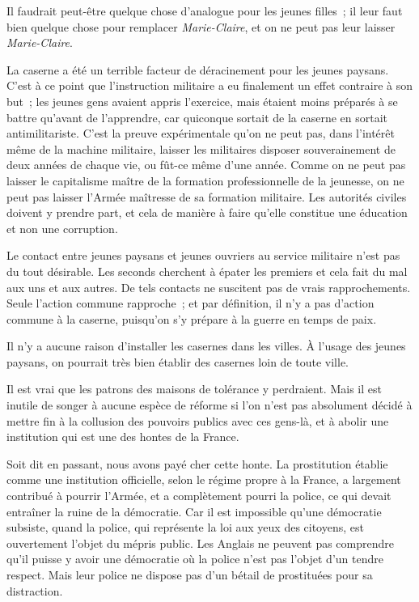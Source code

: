 \documentclass[french,twoside]{book} %
\begin{document}
Il faudrait peut-être quelque chose d'analogue pour les jeunes filles ; il leur faut bien quelque chose pour remplacer {\itshape Marie-Claire}, et on ne peut pas leur laisser {\itshape Marie-Claire}.\par
La caserne a été un terrible facteur de déracinement pour les jeunes paysans. C'est à ce point que l'instruction militaire a eu finalement un effet contraire à son but ; les jeunes gens avaient appris l'exercice, mais étaient moins préparés à se battre qu'avant de l'apprendre, car quiconque sortait de la caserne en sortait antimilitariste. C'est la preuve expérimentale qu'on ne peut pas, dans l'intérêt même de la machine militaire, laisser les militaires disposer souverainement de deux années de chaque vie, ou fût-ce même d'une année. Comme on ne peut pas laisser le capitalisme maître de la formation professionnelle de la jeunesse, on ne peut pas laisser l'Armée maîtresse de sa formation militaire. Les autorités civiles doivent y prendre part, et cela de manière à faire qu'elle constitue une éducation et non une corruption.\par
Le contact entre jeunes paysans et jeunes ouvriers au service militaire n'est pas du tout désirable. Les seconds cherchent à épater les premiers et cela fait du mal aux uns et aux autres. De tels contacts ne suscitent pas de vrais rapprochements. Seule l'action commune rapproche ; et par définition, il n'y a pas d'action commune à la caserne, puisqu'on s'y prépare à la guerre en temps de paix.\par
Il n'y a aucune raison d'installer les casernes dans les villes. À l'usage des jeunes paysans, on pourrait très bien établir des casernes loin de toute ville.\par
Il est vrai que les patrons des maisons de tolérance y perdraient. Mais il est inutile de songer à aucune espèce de réforme si l'on n'est pas absolument décidé à mettre fin à la collusion des pouvoirs publics avec ces gens-là, et à abolir une institution qui est une des hontes de la France.\par
Soit dit en passant, nous avons payé cher cette honte. La prostitution établie comme une institution officielle, selon le régime propre à la France, a largement contribué à pourrir l'Armée, et a complètement pourri la police, ce qui devait entraîner la ruine de la démocratie. Car il est impossible qu'une démocratie subsiste, quand la police, qui représente la loi aux yeux des citoyens, est ouvertement l'objet du mépris public. Les Anglais ne peuvent pas comprendre qu'il puisse y avoir une démocratie où la police n'est pas l'objet d'un tendre respect. Mais leur police ne dispose pas d'un bétail de prostituées pour sa distraction.\par
\end{document}
